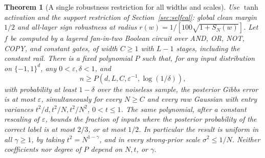 \documentclass[11pt]{article}
\newtheorem{theorem}{Theorem}[section]
\newcommand{\X}{\{-1,1\}^d}
\begin{document}
\begin{theorem}[A single robustness restriction for all widths and scales]
\label{thm:unified}
Use $\tanh$ activation and the support restriction of
Section~\ref{sec:selfcal}: global clean margin $1/2$ and all-layer sign
robustness at radius $r(w)=1/[100\sqrt{1+S_N(w)}]$.
Let $f$ be computed by a layered fan-in-two Boolean circuit over
AND, OR, NOT, COPY, and constant gates, of width $C\ge1$ with $L-1$ stages,
including the constant rail. There is a fixed
polynomial $P$ such that, for any input distribution on $\X$, any
$0<\varepsilon,\delta<1$, and
\[
 n\ge P(d,L,C,\varepsilon^{-1},\log(1/\delta)),
\]
with probability at least $1-\delta$ over the noiseless sample, the posterior
Gibbs error is at most $\varepsilon$, simultaneously for every $N\ge C$ and
every raw Gaussian with entry variances $t^2/d,t^2/N,t^2/N^2$, $0<t\le1$.
The same polynomial, after a constant rescaling of $\varepsilon$, bounds the
fraction of inputs where the posterior probability of the correct label is
at most $2/3$, or at most $1/2$.
In particular the result is uniform in all $\gamma\ge1$, by taking
$t^2=N^{1-\gamma}$, and in every strong-prior scale $\sigma^2\le1/N$.
Neither coefficients nor degree of $P$ depend on $N,t$, or $\gamma$.
\end{theorem}
\end{document}
